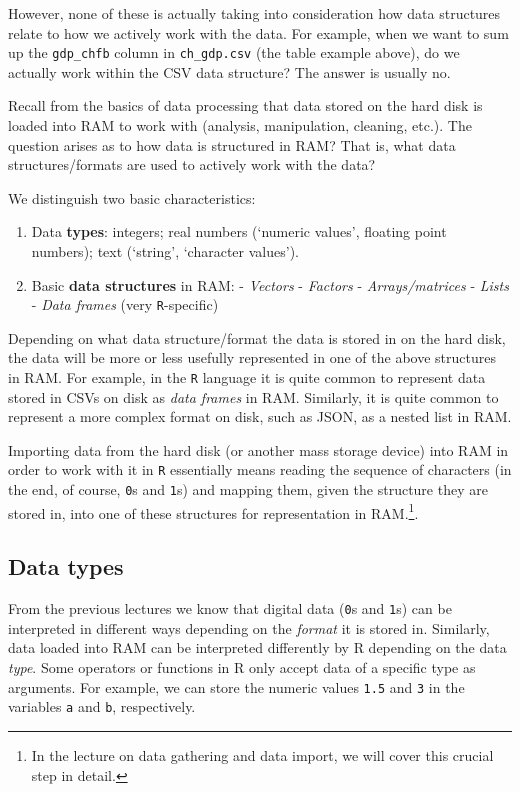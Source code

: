 \documentclass[
  12pt,
]{style/krantz}
\providecommand{\tightlist}{%
  \setlength{\itemsep}{0pt}\setlength{\parskip}{0pt}}
\begin{document}
However, none of these is actually taking into consideration how data structures relate to how we actively work with the data. For example, when we want to sum up the \texttt{gdp\_chfb} column in \texttt{ch\_gdp.csv} (the table example above), do we actually work within the CSV data structure? The answer is usually no.

Recall from the basics of data processing that data stored on the hard disk is loaded into RAM to work with (analysis, manipulation, cleaning, etc.). The question arises as to how data is structured in RAM? That is, what data structures/formats are used to actively work with the data?

We distinguish two basic characteristics:

\begin{enumerate}
\def\labelenumi{\arabic{enumi}.}
\tightlist
\item
  Data \textbf{types}: integers; real numbers (`numeric values', floating point numbers); text (`string', `character values').
\item
  Basic \textbf{data structures} in RAM:
  - \emph{Vectors}
  - \emph{Factors}
  - \emph{Arrays/matrices}
  - \emph{Lists}
  - \emph{Data frames} (very \texttt{R}-specific)
\end{enumerate}

Depending on what data structure/format the data is stored in on the hard disk, the data will be more or less usefully represented in one of the above structures in RAM. For example, in the \texttt{R} language it is quite common to represent data stored in CSVs on disk as \emph{data frames} in RAM. Similarly, it is quite common to represent a more complex format on disk, such as JSON, as a nested list in RAM.

Importing data from the hard disk (or another mass storage device) into RAM in order to work with it in \texttt{R} essentially means reading the sequence of characters (in the end, of course, \texttt{0}s and \texttt{1}s) and mapping them, given the structure they are stored in, into one of these structures for representation in RAM.\footnote{In the lecture on data gathering and data import, we will cover this crucial step in detail.}.

\hypertarget{data-types}{%
\subsection{Data types}\label{data-types}}

From the previous lectures we know that digital data (\texttt{0}s and \texttt{1}s) can be interpreted in different ways depending on the \emph{format} it is stored in. Similarly, data loaded into RAM can be interpreted differently by R depending on the data \emph{type}. Some operators or functions in R only accept data of a specific type as arguments. For example, we can store the numeric values \texttt{1.5} and \texttt{3} in the variables \texttt{a} and \texttt{b}, respectively.
\end{document}

